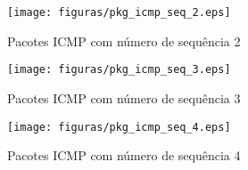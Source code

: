     \begin{figure}[h]
      \centering
      \texttt{[image: figuras/pkg\_icmp\_seq\_2.eps]}
      \caption{Pacotes ICMP com número de sequência 2}
      \label{fig:pkg_icmp_seq_2}
    \end{figure}

    \begin{figure}[h]
      \centering
      \texttt{[image: figuras/pkg\_icmp\_seq\_3.eps]}
      \caption{Pacotes ICMP com número de sequência 3}
      \label{fig:pkg_icmp_seq_3}
    \end{figure}

    \begin{figure}[h]
      \centering
      \texttt{[image: figuras/pkg\_icmp\_seq\_4.eps]}
      \caption{Pacotes ICMP com número de sequência 4}
      \label{fig:pkg_icmp_seq_4}
    \end{figure}
